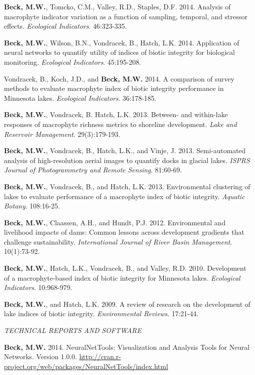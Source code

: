 \documentclass[letterpaper,12pt]{article}
\begin{document}
\textbf{Beck, M.W.}, Tomcko, C.M., Valley, R.D., Staples, D.F. 2014. Analysis of macrophyte indicator variation as a function of sampling, temporal, and stressor effects. \textit{Ecological Indicators}. 46:323-335.

\textbf{Beck, M.W.}, Wilson, B.N., Vondracek, B., Hatch, L.K. 2014. Application of neural networks to quantify utility of indices of biotic integrity for biological monitoring. \textit{Ecological Indicators}. 45:195-208.

Vondracek, B., Koch, J.D., and \textbf{Beck, M.W.} 2014. A comparison of survey methods to evaluate macrophyte index of biotic integrity performance in Minnesota lakes. \textit{Ecological Indicators}. 36:178-185.

\textbf{Beck, M.W.}, Vondracek, B. Hatch, L.K. 2013. Between- and within-lake responses of macrophyte richness metrics to shoreline development. \textit{Lake and Reservoir Management}. 29(3):179-193.

\textbf{Beck, M.W.}, Vondracek, B., Hatch, L.K., and Vinje, J. 2013. Semi-automated analysis of high-resolution aerial images to quantify docks in glacial lakes. \textit{ISPRS Journal of Photogrammetry and Remote Sensing}. 81:60-69.

\textbf{Beck, M.W.}, Vondracek, B., and Hatch, L.K. 2013. Environmental clustering of lakes to evaluate performance of a macrophyte index of biotic integrity. \textit{Aquatic Botany}. 108:16-25.

\textbf{Beck, M.W.}, Claassen, A.H., and Hundt, P.J. 2012. Environmental and livelihood impacts of dams: Common lessons across development gradients that challenge sustainability. \textit{International Journal of River Basin Management}. 10(1):73-92.

\textbf{Beck, M.W.}, Hatch, L.K., Vondracek, B., and Valley, R.D. 2010. Development of a macrophyte-based index of biotic integrity for Minnesota lakes. \textit{Ecological Indicators}. 10:968-979.

\textbf{Beck, M.W.}, and Hatch, L.K. 2009. A review of research on the development of lake indices of biotic integrity. \textit{Environmental Reviews}. 17:21-44.

\vspace{\baselineskip} 
\centerline{\large{\textit{TECHNICAL REPORTS AND SOFTWARE}}}

\textbf{Beck, M.W.} 2014. NeuralNetTools: Visualization and Analysis Tools for Neural Networks. Version 1.0.0. \href{http://cran.r-project.org/web/packages/NeuralNetTools/index.html}{http://cran.r-project.org/web/packages/NeuralNetTools/index.html}
\end{document}
